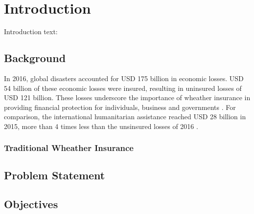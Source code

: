 \chapter{Introduction}\label{chapter:introduction} 

Introduction text: 



\section{Background}\label{section:background}
In 2016, global disasters accounted for USD 175 billion in economic losses. USD 54 billion of these economic losses were insured, resulting in uninsured losses of USD 121 billion. These losses underscore the importance of wheather insurance in providing financial protection for individuals, business and governments \autocite{swissre2017}. For comparison, the international humanitarian assistance reached USD 28 billion in 2015, more than 4 times less than the unsinsured losses of 2016 \autocite{development2016humanitarian}.

\subsection{Traditional Wheather Insurance}




\section{Problem Statement}\label{section:problem_statement}


\section{Objectives}\label{section:objectives}

